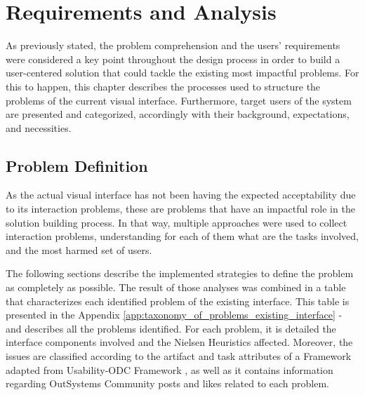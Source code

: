 \chapter{Requirements and Analysis}
\label{cha:requirements_and_analysis}

As previously stated, the problem comprehension and the users' requirements were considered a key point throughout the design process in order to build a user-centered solution that could tackle the existing most impactful problems. For this to happen, this chapter describes the processes used to structure the problems of the current visual interface. Furthermore, target users of the system are presented and categorized, accordingly with their background, expectations, and necessities.

\section{Problem Definition}
\label{sec:problem_definition}

As the actual visual interface has not been having the expected acceptability due to its interaction problems, these are problems that have an impactful role in the solution building process. In that way, multiple approaches were used to collect interaction problems, understanding for each of them what are the tasks involved, and the most harmed set of users.

The following sections describe the implemented strategies to define the problem as completely as possible. The result of those analyses was combined in a table that characterizes each identified problem of the existing interface. This table is presented in the Appendix \ref{app:taxonomy_of_problems_existing_interface} -  and describes all the problems identified. For each problem, it is detailed the interface components involved and the Nielsen Heuristics \cite{nielsen_heuristics} affected. Moreover, the issues are classified according to the artifact and task attributes of a Framework adapted from Usability-ODC Framework \cite{in_process_usability_problem_classification_analysis_improvement}, as well as it contains information regarding OutSystems Community\cite{outsystems_community} posts and likes related to each problem.


